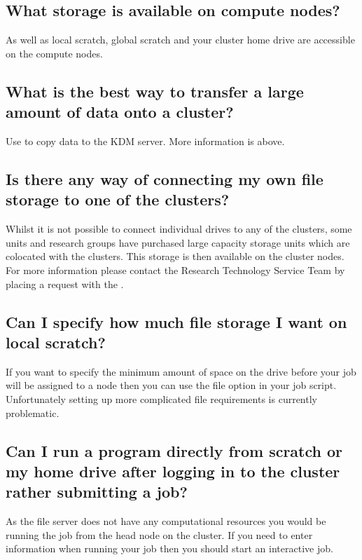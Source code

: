 \documentclass[letterpaper,10pt,english]{sphinxmanual}
\begin{document}
\subsection{What storage is available on compute nodes?}
\label{\detokenize{faq:what-storage-is-available-on-compute-nodes}}
As well as local scratch, global scratch and your cluster home drive are accessible on the compute nodes.


\subsection{What is the best way to transfer a large amount of data onto a cluster?}
\label{\detokenize{faq:what-is-the-best-way-to-transfer-a-large-amount-of-data-onto-a-cluster}}
Use  to copy data to the KDM server. More information is above.


\subsection{Is there any way of connecting my own file storage to one of the clusters?}
\label{\detokenize{faq:is-there-any-way-of-connecting-my-own-file-storage-to-one-of-the-clusters}}
Whilst it is not possible to connect individual drives to any of the clusters, some units and research groups have purchased large capacity storage units which are co\sphinxhyphen{}located with the clusters. This storage is then available on the cluster nodes. For more information please contact the Research Technology Service Team by placing a request with the .


\subsection{Can I specify how much file storage I want on local scratch?}
\label{\detokenize{faq:can-i-specify-how-much-file-storage-i-want-on-local-scratch}}
If you want to specify the minimum amount of space on the drive before your job will be assigned to a node then you can use the file option in your job script. Unfortunately setting up more complicated file requirements is currently problematic.


\subsection{Can I run a program directly from scratch or my home drive after logging in to the cluster rather submitting a job?}
\label{\detokenize{faq:can-i-run-a-program-directly-from-scratch-or-my-home-drive-after-logging-in-to-the-cluster-rather-submitting-a-job}}
As the file server does not have any computational resources you would be running the job from the head node on the cluster. If you need to enter information when running your job then you should start an interactive job.
\end{document}
